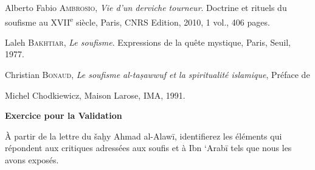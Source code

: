 Alberto Fabio \textsc{Ambrosio}, \emph{Vie d'un derviche tourneur}.
Doctrine et rituels du soufisme au XVII\textsuperscript{e} siècle,
Paris, CNRS Edition, 2010, 1 vol., 406 pages.

Laleh \textsc{Bakhtiar}, \emph{Le soufisme}. Expressions de la quête
mystique, Paris, Seuil, 1977.

Christian \textsc{Bonaud}, \emph{Le soufisme al-taṣawwuf et la
spiritualité islamique}, Préface de

Michel Chodkiewicz, Maison Larose, IMA, 1991.

\textbf{Exercice pour la Validation}

À partir de la lettre du šaḫy Ahmad al-Alawī, identifierez les éléments
qui répondent aux critiques adressées aux soufis et à Ibn `Arabī tels
que nous les avons exposés.


